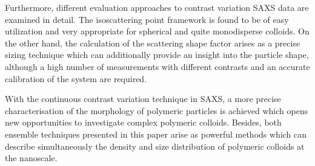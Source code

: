 Furthermore, different evaluation approaches to contrast variation SAXS data are examined in detail. The isoscattering point framework is found to be of easy utilization and very appropriate for spherical and quite monodisperse colloids. On the other hand, the calculation of the scattering shape factor arises as a precise sizing technique which can additionally provide an insight into the particle shape, although a high number of measurements with different contrasts and an accurate calibration of the system are required.

With the continuous contrast variation technique in SAXS, a more precise characterisation of the morphology of polymeric particles is achieved which opens new opportunities to investigate complex polymeric colloids. Besides, both ensemble techniques presented in this paper arise as powerful methods which can describe simultaneously the density and size distribution of polymeric colloids at the nanoscale.
